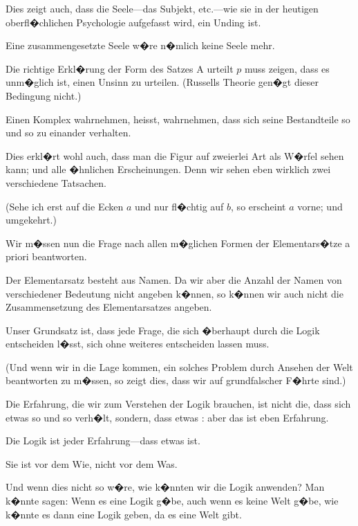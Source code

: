 {Dies zeigt auch, dass die Seele---das Subjekt,
etc.---wie sie in der heutigen oberfl�chlichen Psychologie
aufgefasst wird, ein Unding ist.

{\verystretchyspace
Eine zusammengesetzte Seele w�re n�mlich
keine Seele mehr.}}


{Die richtige Erkl�rung der Form des Satzes \glqq{}A
urteilt $p$\grqq{} muss zeigen, dass es unm�glich ist, einen
Unsinn zu urteilen. (Russells Theorie gen�gt
dieser Bedingung nicht.)}


{Einen Komplex wahrnehmen, heisst, wahrnehmen,
dass sich seine Bestandteile so und so zu einander
verhalten.

Dies erkl�rt wohl auch, dass man die Figur
auf zweierlei Art als W�rfel sehen kann; und alle
�hnlichen Erscheinungen. Denn wir sehen eben
wirklich zwei verschiedene Tatsachen.

(Sehe ich erst auf die Ecken $a$ und nur fl�chtig
auf $b$, so erscheint $a$ vorne; und umgekehrt.)}


{Wir m�ssen nun die Frage nach allen m�glichen
Formen der Elementars�tze a priori beantworten.

Der Elementarsatz besteht aus Namen. Da wir
aber die Anzahl der Namen von verschiedener
Bedeutung nicht angeben k�nnen, so k�nnen wir
auch nicht die Zusammensetzung des Elementarsatzes
angeben.}


{Unser Grundsatz ist, dass jede Frage, die sich
�berhaupt durch die Logik entscheiden l�sst, sich
ohne weiteres entscheiden lassen muss.

(Und wenn wir in die Lage kommen, ein solches
Problem durch Ansehen der Welt beantworten zu
m�ssen, so zeigt dies, dass wir auf grundfalscher
F�hrte sind.)}


{Die \glqq{}Erfahrung\grqq{}, die wir zum Verstehen der
Logik brauchen, ist nicht die, dass sich etwas so
und so verh�lt, sondern, dass etwas : aber das
ist eben  Erfahrung.

Die Logik ist  jeder Erfahrung---dass etwas
 ist.

Sie ist vor dem Wie, nicht vor dem Was.}


{Und wenn dies nicht so w�re, wie k�nnten wir
die Logik anwenden? Man k�nnte sagen: Wenn
es eine Logik g�be, auch wenn es keine Welt g�be,
wie k�nnte es dann eine Logik geben, da es eine
Welt gibt.}



